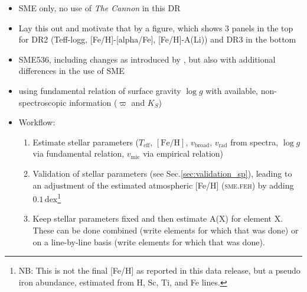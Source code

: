 \documentclass[fleqn,usenatbib,useAMS]{mnras}
\newcommand{\teff}{$T_\mathrm{eff}$\xspace}
\newcommand{\logg}{$\log g$\xspace}
\newcommand{\feh}{$\mathrm{[Fe/H]}$\xspace}
\newcommand{\vmic}{$v_\mathrm{mic}$\xspace}
\newcommand{\vbroad}{$v_\mathrm{broad}$\xspace}
\newcommand{\vrad}{$v_\mathrm{rad}$\xspace}
\begin{document}
\begin{itemize}
\item SME only, no use of \textit{The Cannon} in this DR
\item Lay this out and motivate that by a figure, which shows 3 panels in the top for DR2 (Teff-logg, [Fe/H]-[alpha/Fe], [Fe/H]-A(Li)) and DR3 in the bottom
\item SME536, including changes as introduced by \citet{Piskunov2017}, but also with additional differences in the use of SME
\item using fundamental relation of surface gravity $\log g$ with available, non-spectroscopic information ($\varpi$ and $K_S$)
\item Workflow: 
\begin{enumerate}
	\item Estimate stellar parameters (\teff, \feh, \vbroad, \vrad from spectra, \logg via fundamental relation, \vmic via empirical relation)
	\item Validation of stellar parameters (see Sec.\ref{sec:validation_sp}), leading to an adjustment of the estimated atmospheric [Fe/H] (\textsc{sme.feh}) by adding $0.1\,\mathrm{dex}$\footnote{NB: This is not the final [Fe/H] as reported in this data release, but a pseudo iron abundance, estimated from H, Sc, Ti, and Fe lines.}
	\item Keep stellar parameters fixed and then estimate A(X) for element X. These can be done combined (write elements for which that was done) or on a line-by-line basis (write elements for which that was done).
\end{enumerate}
\end{itemize}
\end{document}
